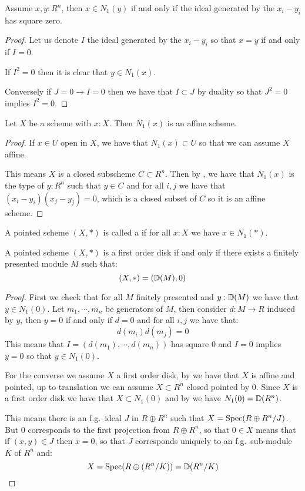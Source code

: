 \begin{lemma}\label{first-order-square-zero}
Assume $x,y:R^n$, then $x\in N_1(y)$ if and only if the ideal generated by the $x_i-y_i$ has square zero.
\end{lemma}

\begin{proof}
Let us denote $I$ the ideal generated by the $x_i-y_i$ so that $x=y$ if and only if $I=0$. 

If $I^2=0$ then it is clear that $y\in N_1(x)$.

Conversely if $J=0 \to I=0$ then we have that $I\subset J$ by duality so that $J^2=0$ implies $I^2=0$.
\end{proof}

\begin{lemma}\label{first-order-schemes}
Let $X$ be a scheme with $x:X$. Then $N_1(x)$ is an affine scheme.
\end{lemma}

\begin{proof}
If $x\in U$ open in $X$, we have that $N_1(x)\subset U$ so that we can assume $X$ affine.

This means $X$ is a closed subscheme $C\subset R^n$. Then by , we have that $N_1(x)$ is the type of $y:R^n$ such that $y\in C$ and for all $i,j$ we have that $(x_i-y_i)(x_j-y_j) = 0$, which is a closed subset of $C$ so it is an affine scheme.
\end{proof}

\begin{definition}
A pointed scheme $(X,*)$ is called a  if for all $x:X$ we have $x\in N_1(*)$.
\end{definition}

\begin{lemma}\label{disk-are-infinitesimal}
A pointed scheme $(X,*)$ is a first order disk if and only if there exists a finitely presented module $M$ such that:
\[(X,*) = (\mathbb{D}(M),0)\]
\end{lemma}

\begin{proof}
First we check that for all $M$ finitely presented and $y:\mathbb{D}(M)$ we have that $y\in N_1(0)$. Let $m_1,\cdots, m_n$ be generators of $M$, then consider $d:M\to R$ induced by $y$, then $y=0$ if and only if $d=0$ and for all $i,j$ we have that:
\[d(m_i)d(m_j) = 0\]
This means that $I = (d(m_1),\cdots,d(m_n))$ has square $0$ and $I=0$ implies $y=0$ so that $y\in N_1(0)$.

For the converse we assume $X$ a first order disk, by  we have that $X$ is affine and pointed, up to translation we can assume $X\subset R^n$ closed pointed by $0$. Since $X$ is a first order disk we have that $X\subset N_1(0)$ and by  we have $N_1(0) = \mathbb{D}(R^n)$.

This means there is an f.g.\ ideal $J$ in $R\oplus R^n$ such that $X=\operatorname{Spec}(R\oplus R^n / J)$.
But $0$ corresponds to the first projection from $R\oplus R^n$, so that $0\in X$ means that if $(x,y)\in J$ then $x=0$, so that $J$ corresponds uniquely to an f.g.\ sub-module $K$ of $R^n$ and:
\[X = \operatorname{Spec}(R\oplus (R^n/K)) = \mathbb{D}(R^n/K)\] 
\end{proof}

